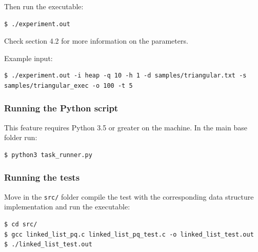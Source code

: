 \documentclass{article}
\begin{document}
Then run the executable:
\begin{verbatim}
$ ./experiment.out
\end{verbatim}

Check section 4.2 for more information on the parameters.

Example input:

\begin{verbatim}
$ ./experiment.out -i heap -q 10 -h 1 -d samples/triangular.txt -s samples/triangular_exec -o 100 -t 5
\end{verbatim}

\subsubsection*{Running the Python script}
This feature requires Python 3.5 or greater on the machine. In the main base folder run:

\begin{verbatim}
$ python3 task_runner.py
\end{verbatim}

\subsubsection*{Running the tests}
Move in the \texttt{src/} folder compile the test with the corresponding data structure implementation and run the executable:
\begin{verbatim}
$ cd src/
$ gcc linked_list_pq.c linked_list_pq_test.c -o linked_list_test.out
$ ./linked_list_test.out
\end{verbatim}

\pagebreak





\end{document}
